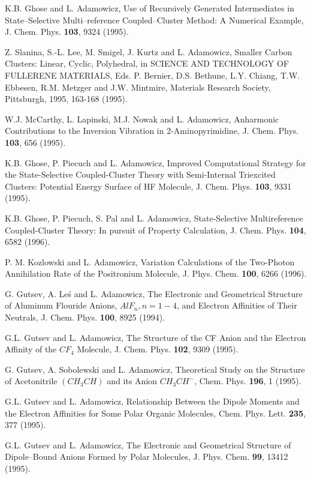 \begin{thebibliography}{999}
K.B. Ghose and L. Adamowicz, Use of Recursively 
Generated Intermediates in State--Selective
Multi--reference Coupled--Cluster Method:  
A Numerical Example, J. Chem. Phys. {\bf 103}, 9324 (1995).

Z. Slanina, S.-L. Lee, M. Smigel, J. Kurtz and 
L. Adamowicz, Smaller Carbon Clusters: Linear, Cyclic,
Polyhedral, in SCIENCE AND TECHNOLOGY OF 
FULLERENE MATERIALS, Eds. P. Bernier, D.S.
Bethune, L.Y. Chiang, T.W. Ebbesen, 
R.M. Metzger and J.W. Mintmire, Materials Research Society,
Pittsburgh, 1995, 163-168 (1995).

W.J. McCarthy, L. Lapinski, M.J. Nowak and 
L. Adamowicz, Anharmonic Contributions to the
Inversion Vibration in 2-Aminopyrimidine, 
J. Chem. Phys. {\bf 103}, 656 (1995).

K.B. Ghose, P. Piecuch and L. Adamowicz, 
Improved Computational Strategy for the State-Selective
Coupled-Cluster Theory with Semi-Internal Triexcited Clusters:  
Potential Energy Surface of HF
Molecule, J. Chem. Phys. {\bf 103}, 9331 (1995).

K.B. Ghose, P. Piecuch, S. Pal and L. Adamowicz, 
State-Selective Multireference Coupled-Cluster
Theory:  In pursuit of Property Calculation, 
J. Chem. Phys. {\bf 104}, 6582 (1996).

P. M. Kozlowski and L. Adamowicz, Variation 
Calculations of the Two-Photon Annihilation Rate of the
Positronium Molecule, J. Phys. Chem. {\bf 100}, 6266 (1996).

G. Gutsev, A. Le\'{s} and L. Adamowicz, The Electronic 
and Geometrical Structure of Aluminum Flouride
Anions, $AlF_n, n = 1-4$, and Electron Affinities of 
Their Neutrals, J. Chem. Phys. {\bf 100}, 8925 (1994).

G.L. Gutsev and L. Adamowicz, The Structure of 
the CF Anion and the Electron Affinity of the $CF_4$
Molecule, J. Chem. Phys. {\bf 102}, 9309 (1995).

G. Gutsev, A. Sobolewski and L. Adamowicz, 
Theoretical Study on the Structure of Acetonitrile
$(CH_3CH)$ and its Anion $CH_3CH^-$, Chem. Phys. 
{\bf 196}, 1 (1995).

G.L. Gutsev and L. Adamowicz, Relationship Between 
the Dipole Moments and the Electron Affinities
for Some Polar Organic Molecules, Chem. Phys. Lett. {\bf 235}, 
377 (1995).

G.L. Gutsev and L. Adamowicz, The Electronic and 
Geometrical Structure of Dipole--Bound Anions
Formed by Polar Molecules, J. Phys. Chem. 
{\bf 99}, 13412 (1995).


\end{thebibliography}
